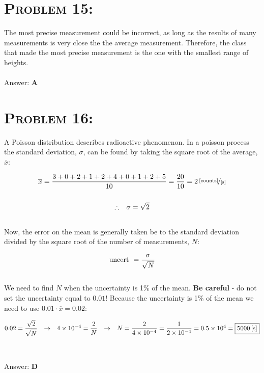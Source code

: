 \documentclass{article}
\providecommand{\e}[1]{\ensuremath{\times 10^{#1}}}
\begin{document}
\section{\textsc{Problem 15:}} The most precise measurement could be incorrect, as long as the results of many measurements is very close the the average measurement. Therefore, the class that made the most precise measurement is the one with the smallest range of heights.
\\\\
Answer: \textbf{\textcolor{ProcessBlue}A}\\


\section{\textsc{Problem 16:}} A Poisson distribution describes radioactive phenomenon. In a poisson process the standard deviation, $\sigma$, can be found by taking the square root of the average, $\overline{x}$:

\begin{gather}
\overline{x} = \frac{3+0+2+1+2+4+0+1+2+5}{10} = \frac{20}{10} = \unitfrac[2]{[counts]}{[s]}\nonumber\\
\nonumber\\
\therefore \hspace{.1in} \sigma = \sqrt{2} \nonumber
\end{gather}
\\
Now, the error on the mean is generally taken be to the standard deviation divided by the square root of the number of measurements, $N$:

\begin{gather}
\text{uncert} \hspace{.05in} = \frac {\sigma}{\sqrt{N}}
\end{gather}
\\
We need to find $N$ when the uncertainty is 1\% of the mean. \textbf{Be careful}  - do not set the uncertainty equal to $0.01$! Because the uncertainty is 1\% of the mean we need to use $0.01 \cdot \overline{x} = 0.02$:

\begin{gather}
0.02 = \frac {\sqrt{2}}{\sqrt{N}} \hspace{.1in} \rightarrow \hspace{.1in} 4\e{-4} = \frac{2}{N} \hspace{.1in} \rightarrow \hspace{.1in} N = \frac{2}{4\e{-4}} = \frac{1}{2\e{-4}} = 0.5\e{4} = \boxed{\unit[5000]{[s]}} \nonumber
\end{gather}
\\\\
Answer: \textbf{\textcolor{ProcessBlue}D}\\
\end{document}
